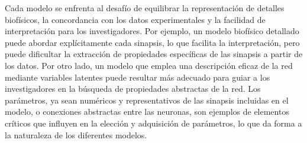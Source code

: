 Cada modelo se enfrenta al desafío de equilibrar la representación de detalles biofísicos, la concordancia con los datos experimentales y la facilidad de interpretación para los investigadores. Por ejemplo, un modelo biofísico detallado puede abordar explícitamente cada sinapsis, lo que facilita la interpretación, pero puede dificultar la extracción de propiedades específicas de las sinapsis a partir de los datos. Por otro lado, un modelo que emplea una descripción eficaz de la red mediante variables latentes puede resultar más adecuado para guiar a los investigadores en la búsqueda de propiedades abstractas de la red. Los parámetros, ya sean numéricos y representativos de las sinapsis incluidas en el modelo, o conexiones abstractas entre las neuronas, son ejemplos de elementos críticos que influyen en la elección y adquisición de parámetros, lo que da forma a la naturaleza de los diferentes modelos.


